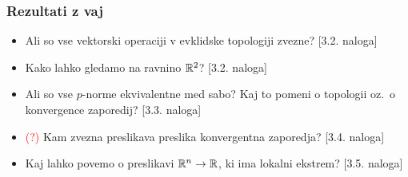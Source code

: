 \subsubsection*{Rezultati z vaj}
\begin{itemize}
    \item Ali so vse vektorski operaciji v evklidske topologiji zvezne? [3.2. naloga]
    \item Kako lahko gledamo na ravnino $\mathbb{R}^2$? [3.2. naloga]
    \item Ali so vse $p$-norme ekvivalentne med sabo? Kaj to pomeni o topologii oz.\ o konvergence zaporedij? [3.3. naloga]
    \item \textcolor{red}{(?)} Kam zvezna preslikava preslika konvergentna zaporedja? [3.4. naloga]
    \item Kaj lahko povemo o preslikavi $\mathbb{R}^n \to \mathbb{R}$, ki ima lokalni ekstrem? [3.5. naloga]
\end{itemize}

